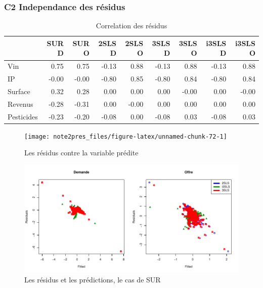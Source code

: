 \documentclass[11pt,]{article}
\begin{document}
\FloatBarrier

\newpage

\hypertarget{c2-independance-des-residus}{%
\subsubsection{C2 Independance des
résidus}\label{c2-independance-des-residus}}

\FloatBarrier

\begin{table}[ht]
\centering
\begin{tabular}{l|rrrrrrrr}
  \hline
 & SUR D & SUR O & 2SLS D & 2SLS O & 3SLS D & 3SLS O & i3SLS D & i3SLS O \\ 
  \hline
Vin & 0.75 & 0.75 & -0.13 & 0.88 & -0.13 & 0.88 & -0.13 & 0.88 \\ 
  IP & -0.00 & -0.00 & -0.80 & 0.85 & -0.80 & 0.84 & -0.80 & 0.84 \\ 
  Surface & 0.32 & 0.28 & 0.00 & 0.00 & 0.00 & -0.00 & 0.00 & -0.00 \\ 
  Revenus & -0.28 & -0.31 & 0.00 & -0.00 & 0.00 & 0.00 & 0.00 & 0.00 \\ 
  Pesticides & -0.23 & -0.20 & -0.08 & 0.00 & -0.08 & 0.03 & -0.08 & 0.03 \\ 
   \hline
\end{tabular}
\caption{Correlation des résidus} 
\end{table}

\FloatBarrier

\FloatBarrier

\begin{figure}[!htbp]

{\centering \texttt{[image: note2pres\_files/figure-latex/unnamed-chunk-72-1]} 

}

\caption{Les résidus contre la variable prédite}\label{fig:unnamed-chunk-72}
\end{figure}

\FloatBarrier

\FloatBarrier

\begin{figure}[!htbp]

{\centering \includegraphics{note2pres_files/figure-latex/unnamed-chunk-73-1} 

}

\caption{Les résidus et les prédictions, le cas de SUR}\label{fig:unnamed-chunk-73}
\end{figure}
\end{document}
